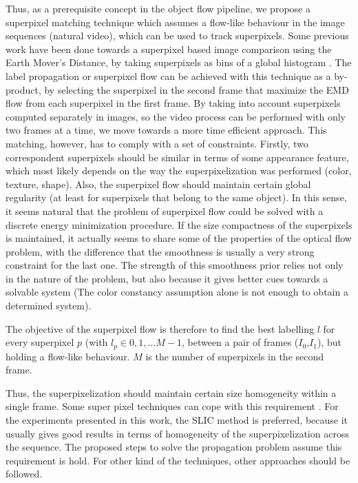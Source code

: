 Thus, as a prerequisite concept in the object flow pipeline, we propose a superpixel matching technique which assumes a flow-like behaviour in the image 
sequences (natural video), which can be used to track superpixels. 
Some previous work have been done towards a
superpixel based image comparison using the Earth Mover's Distance, by taking superpixels 
as bins of a global histogram \cite{c2}. The label propagation or superpixel flow can be
achieved with this technique as a by-product, by selecting the superpixel in the second frame that 
maximize the EMD flow from each superpixel in the first frame.
By taking into account superpixels computed separately in images, so the video process can be 
performed with only two frames at a time, we move towards a more time efficient approach. 
This matching, however, has to comply with a set of constraints. 
Firstly, two correspondent superpixels should be similar in terms of some appearance
feature, which most likely depends on the way the superpixelization was performed (color, texture,
shape). Also, the superpixel flow  should maintain certain global regularity (at least for
superpixels that belong to the same object). In this sense, it seems
natural that the problem of superpixel flow could be solved with a discrete energy minimization
procedure. 
If the size compactness of the superpixels is maintained,  it actually seems to 
share some of the properties of the optical flow problem, with the difference that the
smoothness is usually a very strong constraint for the last one. 
The strength of this smoothness prior relies not only in the nature of the problem, but also
because it gives better cues towards a solvable system (The color constancy assumption alone is not enough to obtain a determined system).

The objective of the superpixel flow is therefore to find the best labelling $l$ for every superpixel $p$ (with $l_p \in {0,1,...M-1}$, between a pair of frames ($I_{0}$,$I_{1}$), but holding a flow-like behaviour. $M$ is the number of superpixels in the second frame.

Thus, the superpixelization should maintain certain size homogeneity within a single frame. Some super
pixel techniques can cope with this requirement \cite{c9}\cite{c10}. For the experiments presented 
in this work, the SLIC method \cite{c9} is preferred, because it usually gives
good results in terms of homogeneity of the superpixelization across the sequence. 
The proposed steps to solve the propagation problem assume this requirement is hold. 
For other kind of the techniques, other approaches should be followed.

